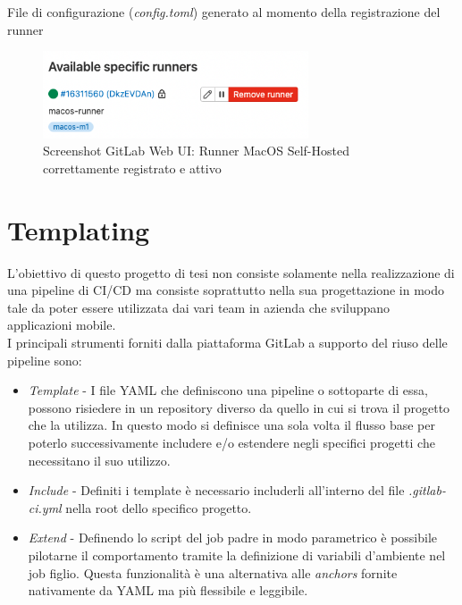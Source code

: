 \begin{listing}[H]
\inputminted{toml}{code/4-macos-runner-config}
\caption{File di configurazione (\textit{config.toml}) generato al momento della registrazione del runner}
\end{listing}

\begin{figure}[H]
\centering
\includegraphics[width=0.7\textwidth]{img/Screenshot 2022-07-07 at 11.40.13.png}
\caption{Screenshot GitLab Web UI: Runner MacOS Self-Hosted correttamente registrato e attivo}
\end{figure}

\section{Templating}
L'obiettivo di questo progetto di tesi non consiste solamente nella realizzazione di una pipeline di CI/CD ma consiste soprattutto nella sua progettazione in modo tale da poter essere utilizzata dai vari team in azienda che sviluppano applicazioni mobile.\\
I principali strumenti forniti dalla piattaforma GitLab a supporto del riuso delle pipeline sono:
\begin{itemize}
    \item \textit{Template} - I file YAML che definiscono una pipeline o sottoparte di essa, possono risiedere in un repository diverso da quello in cui si trova il progetto che la utilizza. In questo modo si definisce una sola volta il flusso base per poterlo successivamente includere e/o estendere negli specifici progetti che necessitano il suo utilizzo.
    \item \textit{Include} - Definiti i template è necessario includerli all'interno del file \textit{.gitlab-ci.yml} nella root dello specifico progetto.
    \item \textit{Extend} - Definendo lo script del job padre in modo parametrico è possibile pilotarne il comportamento tramite la definizione di variabili d'ambiente nel job figlio. Questa funzionalità è una alternativa alle \textit{anchors} fornite nativamente da YAML ma più flessibile e leggibile. 
\end{itemize}

